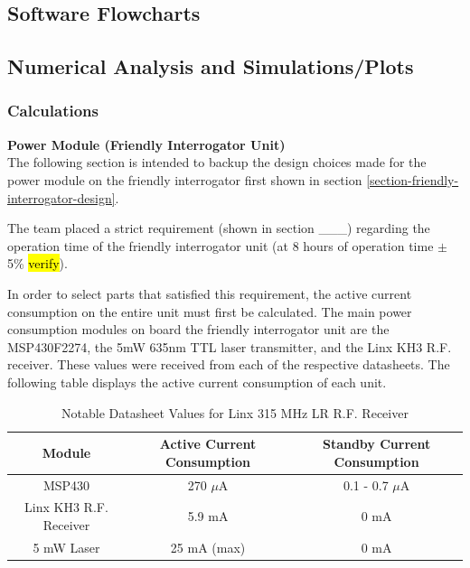 \documentclass[letterpaper,10pt]{article}
\begin{document}
\begin{spacing}{1.15}
\subsection{Software Flowcharts}


\subsection{Numerical Analysis and Simulations/Plots} \label{section-simulations-calculations}

\subsubsection{Calculations}
\normalsize\textbf{Power Module (Friendly Interrogator Unit)} \\
The following section is intended to backup the design choices made for the power module on the friendly interrogator first shown in section \ref{section-friendly-interrogator-design}.

The team placed a strict requirement (shown in section \_\_\_) regarding the operation time of the friendly interrogator unit (at 8 hours of operation time $\pm$ 5\% \hl{verify}).

In order to select parts that satisfied this requirement, the active current consumption on the entire unit must first be calculated. The main power consumption modules on board the friendly interrogator unit are the MSP430F2274, the 5mW 635nm TTL laser transmitter, and the Linx KH3 R.F. receiver. These values were received from each of the respective datasheets. The following table displays the active current consumption of each unit. 


\begin{table}[htbp]
	\centering
	\begin{tabular}{c|c|c}	%
		\toprule	%
		Module & Active Current Consumption & Standby Current Consumption\\
		\midrule
		MSP430 & 270 $\mu$A & 0.1 - 0.7 $\mu$A\\ 
		Linx KH3 R.F. Receiver & 5.9 mA & 0 mA\\
		5 mW Laser & 25 mA (max) & 0 mA \\
	\bottomrule	%
	\end{tabular}%
	\caption{Notable Datasheet Values for Linx 315 MHz LR R.F. Receiver}
	\label{tab:table2}	%
\end{table}%


\end{spacing}
\end{document}
